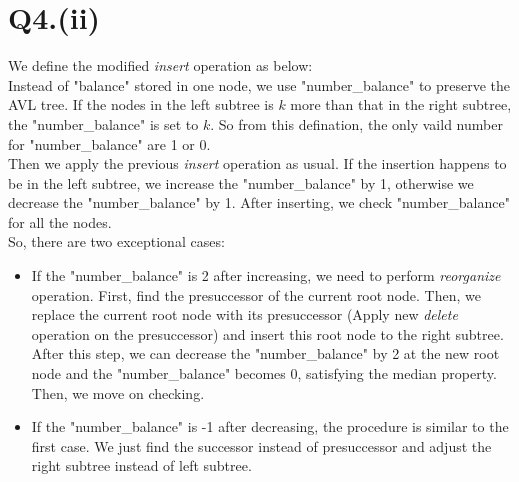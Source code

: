 \documentclass{article}
\begin{document}
\section*{Q4.(ii)}
    We define the modified \emph{insert} operation as below:\\
    Instead of "balance" stored in one node, we use "number\_balance" to preserve the AVL tree. If the nodes in the left subtree is $k$
    more than that in the right subtree, the "number\_balance" is set to $k$. So from this defination, the only vaild number for "number\_balance"
    are 1 or 0.\\
    Then we apply the previous \emph{insert} operation as usual. If the insertion happens to be in the left subtree, we increase the
    "number\_balance" by 1, otherwise we decrease the "number\_balance" by 1. After inserting, we check "number\_balance" for all the nodes.\\
    So, there are two exceptional cases:
\begin{itemize}
    \item If the "number\_balance" is 2 after increasing, we need to perform \emph{reorganize} operation. First, find the presuccessor of the 
          current root node. Then, we replace the current root node with its presuccessor (Apply new \emph{delete} operation on the presuccessor) 
          and insert this root node to the right subtree. After this step, we can decrease the "number\_balance" by 2 at the new root node and the "number\_balance" 
          becomes 0, satisfying the median property. Then, we move on checking.
    \item If the "number\_balance" is -1 after decreasing, the procedure is similar to the first case. We just find the successor instead of 
          presuccessor and adjust the right subtree instead of left subtree.
\end{itemize}
\end{document}
